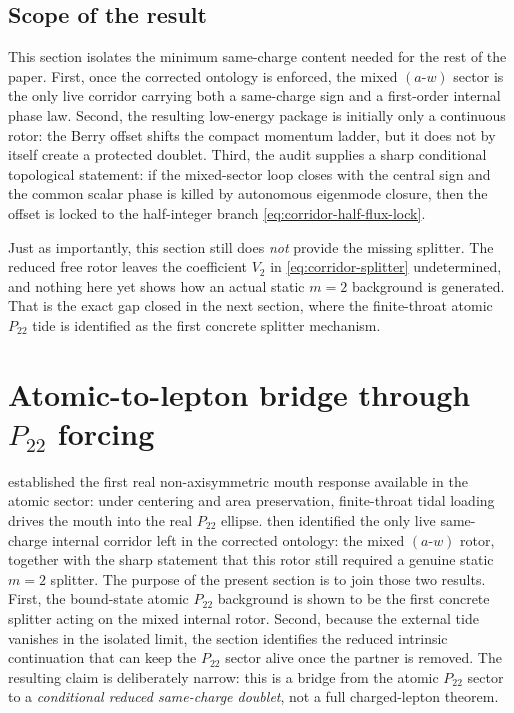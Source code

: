 \documentclass[11pt]{article}
\theoremstyle{plain}
\theoremstyle{definition}
\theoremstyle{remark}
\newcommand{\Ptwotwo}{P_{22}}
\begin{document}
\subsection{Scope of the result}\label{subsec:corridor-scope}

This section isolates the minimum same-charge content needed for the rest of the paper. First, once the corrected ontology is enforced, the mixed $(a\text{-}w)$ sector is the only live corridor carrying both a same-charge sign and a first-order internal phase law. Second, the resulting low-energy package is initially only a continuous rotor: the Berry offset shifts the compact momentum ladder, but it does not by itself create a protected doublet. Third, the audit supplies a sharp conditional topological statement: if the mixed-sector loop closes with the central sign and the common scalar phase is killed by autonomous eigenmode closure, then the offset is locked to the half-integer branch \cref{eq:corridor-half-flux-lock}.

Just as importantly, this section still does \emph{not} provide the missing splitter. The reduced free rotor leaves the coefficient $V_2$ in \cref{eq:corridor-splitter} undetermined, and nothing here yet shows how an actual static $m=2$ background is generated. That is the exact gap closed in the next section, where the finite-throat atomic \(\Ptwotwo\) tide is identified as the first concrete splitter mechanism.

\section{Atomic-to-lepton bridge through \texorpdfstring{$\Ptwotwo$}{P22} forcing}\label{sec:bridge}

 established the first real non-axisymmetric mouth response available in the atomic sector: under centering and area preservation, finite-throat tidal loading drives the mouth into the real \(\Ptwotwo\) ellipse.  then identified the only live same-charge internal corridor left in the corrected ontology: the mixed \((a\text{-}w)\) rotor, together with the sharp statement that this rotor still required a genuine static \(m=2\) splitter. The purpose of the present section is to join those two results. First, the bound-state atomic \(\Ptwotwo\) background is shown to be the first concrete splitter acting on the mixed internal rotor. Second, because the external tide vanishes in the isolated limit, the section identifies the reduced intrinsic continuation that can keep the \(\Ptwotwo\) sector alive once the partner is removed. The resulting claim is deliberately narrow: this is a bridge from the atomic \(\Ptwotwo\) sector to a \emph{conditional reduced same-charge doublet}, not a full charged-lepton theorem.
\end{document}
